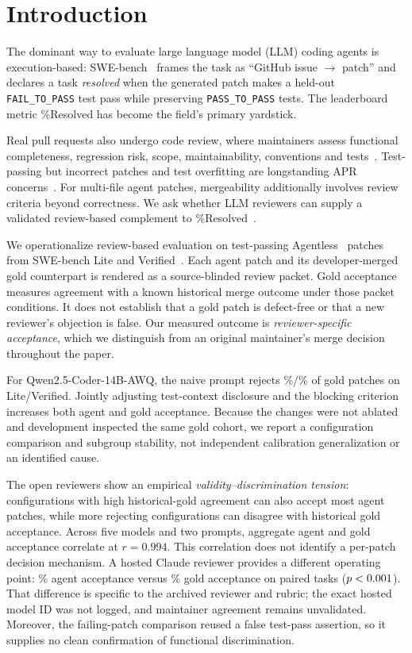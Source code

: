 \documentclass[10pt,conference]{IEEEtran}
\begin{document}
\section{Introduction}
The dominant way to evaluate large language model (LLM) coding agents is execution-based:
SWE-bench~\cite{swebench} frames the task as ``GitHub issue $\rightarrow$ patch'' and
declares a task \emph{resolved} when the generated patch makes a held-out
\texttt{FAIL\_TO\_PASS} test pass while preserving \texttt{PASS\_TO\_PASS} tests. The
leaderboard metric \%Resolved has become the field's primary yardstick.

Real pull requests also undergo code review, where maintainers assess functional
completeness, regression risk, scope, maintainability, conventions and tests~\cite{modernreview,tufanoreview}.
Test-passing but incorrect patches and test overfitting are longstanding APR
concerns~\cite{overfitting,qirandom,patchcorrectness,patchsim}. For multi-file agent
patches, mergeability additionally involves review criteria beyond correctness.
We ask whether LLM reviewers can supply a validated review-based complement to
\%Resolved~\cite{llmjudge}.


We operationalize review-based evaluation on test-passing Agentless~\cite{agentless}
patches from SWE-bench Lite and Verified~\cite{swebench,swebenchverified}. Each agent patch
and its developer-merged gold counterpart is rendered as a source-blinded review packet.
Gold acceptance measures agreement with a known historical merge outcome under those
packet conditions. It does not establish that a gold patch is defect-free or that a new
reviewer's objection is false. Our measured outcome is \emph{reviewer-specific acceptance},
which we distinguish from an original maintainer's merge decision throughout the paper.

For Qwen2.5-Coder-14B-AWQ, the naive prompt rejects
\strictFalseRejLite\%/\strictFalseRejVerified\% of gold patches on Lite/Verified.
Jointly adjusting test-context disclosure and the blocking criterion increases both agent
and gold acceptance. Because the changes were not ablated and development inspected the
same gold cohort, we report a configuration comparison and subgroup stability, not
independent calibration generalization or an identified cause.

The open reviewers show an empirical \emph{validity--discrimination tension}: configurations
with high historical-gold agreement can also accept most agent patches, while more rejecting
configurations can disagree with historical gold acceptance. Across five models and two
prompts, aggregate agent and gold acceptance correlate at $r=0.994$. This correlation does
not identify a per-patch decision mechanism. A hosted Claude reviewer provides a different
operating point: \frontAgent\% agent acceptance versus \frontGold\% gold acceptance on
\frontNpair{} paired tasks ($p<0.001$). That difference is specific to the archived
reviewer and rubric; the exact hosted model ID was not logged, and maintainer agreement
remains unvalidated. Moreover, the failing-patch comparison reused a false test-pass
assertion, so it supplies no clean confirmation of functional discrimination.
\end{document}
